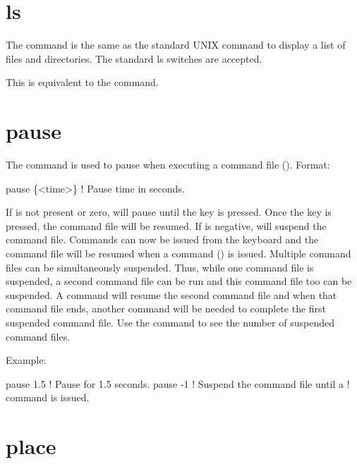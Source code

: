 \section{ls}
\label{s:ls}

The  command is the same as the standard UNIX  command to display a list of files and
directories. The standard ls switches are accepted.

This is equivalent to the  command.

\section{pause}
\label{s:pause}

The  command is used to pause \tao when executing a command file
(). Format:
\begin{example}
  pause \{<time>\} ! Pause time in seconds.
\end{example}

\vskip 10pt
If  is not present or zero, \tao will pause until the  key is pressed. Once the
 key is pressed, the command file will be resumed. If  is negative, \tao will
suspend the command file. Commands can now be issued from the keyboard and the command file will be
resumed when a  command () is issued. Multiple command files can be
simultaneously suspended.  Thus, while one command file is suspended, a second command file can be
run and this command file too can be suspended. A  command will resume the second
command file and when that command file ends, another  command will be needed to
complete the first suspended command file. Use the  command to see the number of
suspended command files.

Example:
\begin{example}
  pause 1.5    ! Pause for 1.5 seconds.
  pause -1     ! Suspend the command file until a  
               !   command is issued.
\end{example}

\section{place}
\label{s:place}


